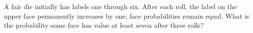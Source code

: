 A fair die initially has labels one through six. After each roll, the label on the upper face permanently increases by one; face probabilities remain equal. What is the probability some face has value at least seven after three rolls?
